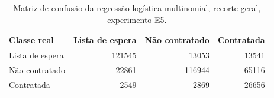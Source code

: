 \begin{table}
\caption{Matriz de confusão da regressão logística multinomial, recorte geral, experimento E5.}
\label{tab:matriz_confusao_logit_ternario_recorte_geral_holdout_80_20_e5}
\begin{tabular}{lrrr}
\toprule
Classe real & Lista de espera & Não contratado & Contratada \\
\midrule
Lista de espera & 121545 & 13053 & 13541 \\
Não contratado & 22861 & 116944 & 65116 \\
Contratada & 2549 & 2869 & 26656 \\
\bottomrule
\end{tabular}
\end{table}
